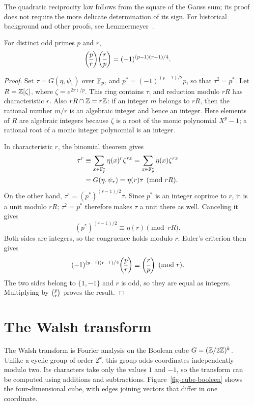 The quadratic reciprocity law follows from the square of the Gauss sum;
its proof does not require the more delicate determination of its sign.
For historical background and other proofs, see Lemmermeyer~\cite{lemmermeyer}.

\begin{thm}
For distinct odd primes $p$ and $r$,
\begin{equation}
\label{eq-reciprocity-quadratic}
 \legsymb pr\legsymb rp=(-1)^{(p-1)(r-1)/4}.
\end{equation}
\end{thm}
\begin{proof}
Set $\tau=G(\eta,\psi_1)$ over $\mathbb{F}_p$, and
$p^*=(-1)^{(p-1)/2}p$, so that $\tau^2=p^*$.
Let $R=\mathbb{Z}[\zeta]$, where $\zeta=e^{2\pi\imath/p}$.
This ring contains $\tau$, and reduction modulo $rR$ has characteristic $r$.
Also $rR\cap\mathbb{Z}=r\mathbb{Z}$: if an integer $m$ belongs to $rR$, then the rational
number $m/r$ is an algebraic integer and hence an integer.
Here elements of $R$ are algebraic integers because $\zeta$ is a root of
the monic polynomial $X^p-1$; a rational root of a monic integer polynomial
is an integer.

In characteristic $r$, the binomial theorem gives
\begin{align*}
 \tau^r
 &\equiv\sum_{x\in\mathbb{F}_p^*}\eta(x)^r\zeta^{rx}
 =\sum_{x\in\mathbb{F}_p^*}\eta(x)\zeta^{rx}\\
 &=G(\eta,\psi_r)=\eta(r)\tau\pmod{rR}.
\end{align*}
On the other hand, $\tau^r=(p^*)^{(r-1)/2}\tau$.
Since $p^*$ is an integer coprime to $r$, it is a unit modulo $rR$;
$\tau^2=p^*$ therefore makes $\tau$ a unit there as well. Canceling it gives
\[
 (p^*)^{(r-1)/2}\equiv\eta(r)\pmod{rR}.
\]
Both sides are integers, so the congruence holds modulo $r$. Euler's criterion
then gives
\[
 (-1)^{(p-1)(r-1)/4}\legsymb pr\equiv\legsymb rp\pmod r.
\]
The two sides belong to $\{1,-1\}$ and $r$ is odd, so they are equal as
integers. Multiplying by $\legsymb pr$ proves the result.
\end{proof}

\section{The Walsh transform}
\label{sect1-transforme-walsh}
The Walsh transform is Fourier analysis on the Boolean cube
$G=(\mathbb{Z}/2\mathbb{Z})^k$. Unlike a cyclic group of order $2^k$, this group adds
coordinates independently modulo two. Its characters take only the values
$1$ and $-1$, so the transform can be computed using additions and subtractions.
Figure~\ref{fig-cube-booleen} shows the four-dimensional cube, with edges
joining vectors that differ in one coordinate.

